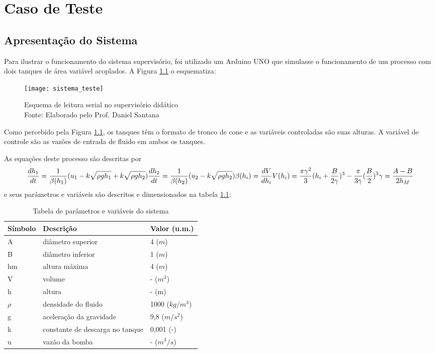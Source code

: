 \chapter{Caso de Teste}

\section{Apresentação do Sistema}

Para ilustrar o funcionamento do sistema supervisório, foi utilizado um Arduino UNO que simulasse o funcionamento de um processo com dois tanques de área variável acoplados. A Figura \ref{img_sistema_teste} o esquematiza:

\begin{figure}[htb]
	\centering
	\texttt{[image: sistema\_teste]}
	\caption{Esquema de leitura serial no supervisório didático\\Fonte: Elaborado pelo Prof. Daniel Santana}
	\label{img_sistema_teste}
\end{figure}

Como percebido pela Figura \ref{img_sistema_teste}, os tanques têm o formato de tronco de cone e as variáveis controladas são suas alturas. A variável de controle são as vazões de entrada de fluido em ambos os tanques.

As equações deste processo são descritas por
\begin{equation}
\frac{dh_1}{dt} = \frac{1}{\beta(h_1)}(u_1 - k\sqrt{\rho g h_1} + k\sqrt{\rho g h_2})\\
\frac{dh_2}{dt} = \frac{1}{\beta(h_2)}(u_2 - k\sqrt{\rho g h_2})\\
\beta(h_i) = \frac{dV}{dh_i}\\
V(h_i) = \frac{\pi\gamma^2}{3}(h_i + \frac{B}{2\gamma})^3 - \frac{\pi}{3\gamma}(\frac{B}{2})^3\\
\gamma = \frac{A-B}{2h_M}\\
\end{equation}
e seus parâmetros e variáveis são descritos e dimensionados na tabela \ref{tbl_parameters}:

\begin{table}[htb]
	\centering
	\begin{tabular} {|m{5em} m{15em} m{8em}|}
		\hline
		Símbolo & Descrição & Valor (u.m.) \\
		\hline
		A & diâmetro superior & 4 ($m$) \\
		B & diâmetro inferior & 1 ($m$) \\
		hm & altura máxima & 4 ($m$) \\
		V & volume & - ($m^3$) \\
		h & altura & - (m) \\
		$\rho$ & densidade do fluido & 1000 ($kg/m^3$) \\
		g & aceleração da gravidade & 9,8 ($m/s^2$) \\
		k & constante de descarga no tanque & 0,001 (-)\\
		u & vazão da bomba & - ($m^3/s$)\\
		\hline
	\end{tabular}
	\caption{Tabela de parâmetros e variáveis do sistema}
	\label{tbl_parameters}
\end{table}

